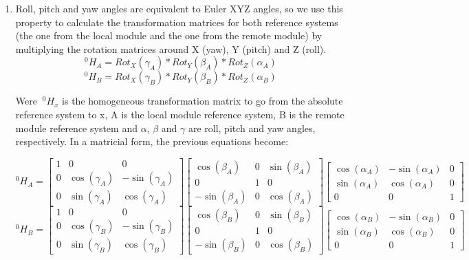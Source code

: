 \begin{enumerate}
	 \item Roll, pitch and yaw angles are equivalent to Euler XYZ angles, so we use this property to calculate the transformation matrices for both reference systems (the one from the local module and the one from the remote module) by multiplying the rotation matrices around X (yaw), Y (pitch) and Z (roll).
	 \[ ^{0}H_A = Rot_X(\gamma_A) * Rot_Y(\beta_A) * Rot_Z(\alpha_A) \]
	 \[ ^{0}H_B = Rot_X(\gamma_B) * Rot_Y(\beta_B) * Rot_Z(\alpha_B) \]
	 
	 Were $~^{0}H_{x}$ is the homogeneous transformation matrix to go from the absolute reference system to x, A is the local module reference system, B is the remote module reference system and $\alpha$, $\beta$ and $\gamma$ are roll, pitch and yaw angles, respectively. In a matricial form, the previous equations become:
	 
	 \[  ^{0}H_A =  
	 \begin{bmatrix}
	 1 & 0 & 0 \\ 
	 0 & \cos(\gamma_A) & -\sin(\gamma_A)\\
	 0 & \sin(\gamma_A) & \cos(\gamma_A)
	 \end{bmatrix}
	 \begin{bmatrix}
	 \cos(\beta_A)  & 0 & \sin(\beta_A) \\ 
	 			0   & 1 & 			0  \\
	 -\sin(\beta_A) & 0 & \cos(\beta_A)
	 \end{bmatrix}
	 	 \begin{bmatrix}
	  \cos(\alpha_A)  & -\sin(\alpha_A) & 0 \\ 
	  \sin(\alpha_A)  &  \cos(\alpha_A) & 0 \\
	 			   0  &               0 & 1
	 \end{bmatrix}\]	 	 
	 \[  ^{0}H_B =  
	 \begin{bmatrix}
	 1 & 0 & 0 \\ 
	 0 & \cos(\gamma_B) & -\sin(\gamma_B)\\
	 0 & \sin(\gamma_B) & \cos(\gamma_B)
	 \end{bmatrix}
	 \begin{bmatrix}
	 \cos(\beta_B)  & 0 & \sin(\beta_B) \\ 
	 			0   & 1 & 			0  \\
	 -\sin(\beta_B) & 0 & \cos(\beta_B)
	 \end{bmatrix}
	 	 \begin{bmatrix}
	  \cos(\alpha_B)  & -\sin(\alpha_B) & 0 \\ 
	  \sin(\alpha_B)  &  \cos(\alpha_B) & 0 \\
	 			   0  &               0 & 1
	 \end{bmatrix}\]\\
	 

\end{enumerate}
